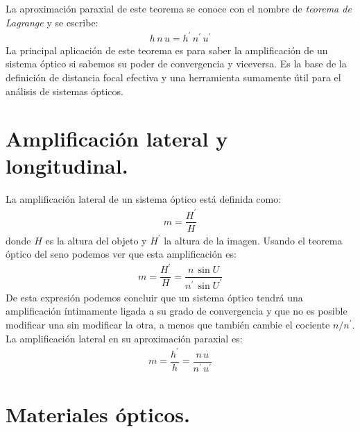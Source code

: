 \documentclass[14pt]{extarticle}
\begin{document}
La aproximación paraxial de este teorema se conoce con el nombre de \textit{teorema de Lagrange} y se escribe:
\begin{align}
h \, n \, u = h^{\prime} \, n^{\prime} \, u^{\prime}
\label{eq:ecuacion_I_46}
\end{align}
La principal aplicación de este teorema es para saber la amplificación de un sistema óptico si sabemos su poder de convergencia y viceversa. Es la base de la definición de distancia focal efectiva y una herramienta sumamente útil para el análisis de sistemas ópticos.

\section{Amplificación lateral y longitudinal.}

La amplificación lateral de un sistema óptico está definida como:
\begin{align}
m = \dfrac{H^{\prime}}{H}
\label{eq:ecuacion_I_47}
\end{align}
donde $H$ es la altura del objeto y $H^{\prime}$ la altura de la imagen. Usando el teorema óptico del seno podemos ver que esta amplificación es:
\begin{align}
m = \dfrac{H^{\prime}}{H} = \dfrac{n \, \sin U}{n^{\prime} \, \sin U^{\prime}} 
\label{eq:ecuacion_I_48}
\end{align}
De esta expresión podemos concluir que un sistema óptico tendrá una amplificación íntimamente ligada a su grado de convergencia y que no es posible modificar una sin modificar la otra, a menos que también cambie el cociente $n/n^{\prime}$. La amplificación lateral en su aproximación paraxial es:
\begin{align}
m = \dfrac{h^{\prime}}{h} = \dfrac{n \, u}{n^{\prime} \, u^{\prime}} 
\label{eq:ecuacion_I_49}
\end{align}

\section{Materiales ópticos.}
\end{document}
